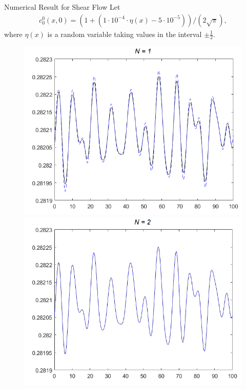 

\begin{frame}{Numerical Result for Shear Flow}
		\scriptsize
		Let 
		\begin{align*}
			c^0_0 (x,0) = (1+(1\cdot10^{-4} \cdot \eta(x)-5\cdot10^{-5}))/(2\sqrt{\pi}),
		\end{align*}
		where $\eta(x)$ is a random variable taking values in the interval $\pm \frac{1}{2}$.
		
		\begin{figure}
			\centering
			\begin{minipage}{0.46\textwidth}
				\includegraphics[width=\textwidth]{Bilder_wx/ClusterFormation/N=1vsN=6_Dr=0.05_mx=8192}
			\end{minipage}
			\hfill
			\begin{minipage}{0.46\textwidth}
				\includegraphics[width=\textwidth]{Bilder_wx/ClusterFormation/N=2vsN=6_Dr=0.05_mx=8192}

\end{minipage}
\end{figure}
\end{frame}

